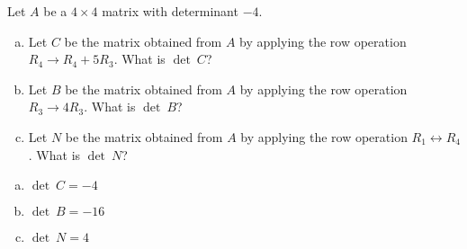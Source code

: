 
\begin{exerciseStatement}


Let \(A\) be a \(4 \times 4\) matrix with determinant \( -4 \).


\begin{enumerate}[(a)]
\item Let \(C\) be the matrix obtained from \(A\) by applying the row operation \( R_4 \to R_4 + 5R_3 \). What is \(\operatorname{det}\ C\)?
\item Let \(B\) be the matrix obtained from \(A\) by applying the row operation \( R_3 \to 4R_3 \). What is \(\operatorname{det}\ B\)?
\item Let \(N\) be the matrix obtained from \(A\) by applying the row operation \( R_1 \leftrightarrow R_4 \). What is \(\operatorname{det}\ N\)?
\end{enumerate}
    
\end{exerciseStatement}
    
\begin{exerciseAnswer} 

\begin{enumerate}[(a)]
\item \(\operatorname{det}\ C= -4 \)
\item \(\operatorname{det}\ B= -16 \)
\item \(\operatorname{det}\ N= 4 \)
\end{enumerate}
    
\end{exerciseAnswer}
    
